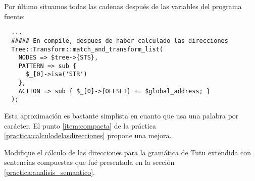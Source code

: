 Por último situamos todas las cadenas después de las variables
del programa fuente:

\begin{verbatim}
  ... 
  ##### En compile, despues de haber calculado las direcciones
  Tree::Transform::match_and_transform_list(
    NODES => $tree->{STS},
    PATTERN => sub { 
      $_[0]->isa('STR')
    },
    ACTION => sub { $_[0]->{OFFSET} += $global_address; }
  );
\end{verbatim}

Esta aproximación es bastante simplista en cuanto que usa una palabra
por carácter. 
El punto
\ref{item:compacta}
de la práctica
\ref{practica:calculodelasdirecciones} propone una mejora.

\label{practica:calculodelasdirecciones}
Modifique el cálculo de las direcciones para la gramática de Tutu
extendida con sentencias compuestas que fué presentada en 
la sección 
\ref{practica:analisis_semantico}.



